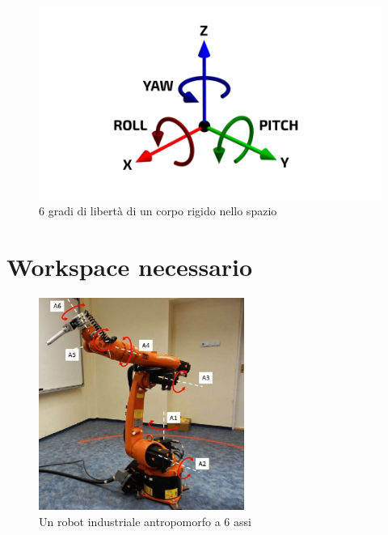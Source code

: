 \documentclass[%
corpo=11pt,
twoside,
 stile=classica,
oldstyle,
greek,%
]{toptesi}
\begin{document}
	 \begin{figure}
	 	\centering
	 	\includegraphics[width=\textwidth]{pictures/6DOF.png}
	 	\caption{6 gradi di libertà di un corpo rigido nello spazio}
	 	\label{fig:6DOF}
	 \end{figure}

\section{Workspace necessario}

\begin{figure}
	\centering
	\includegraphics[width=0.6\textwidth]{pictures/KUKA.png}
	\caption{Un robot industriale antropomorfo a 6 assi}
	\label{fig:KUKA}
\end{figure}
\end{document}
